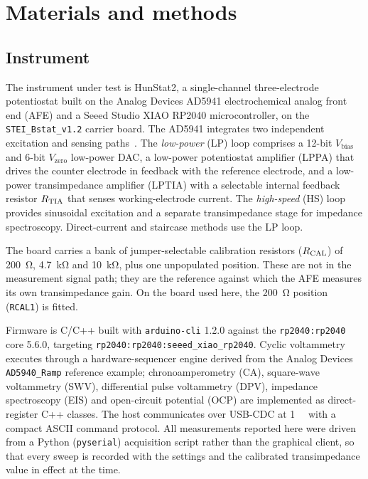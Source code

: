 \section{Materials and methods}
\label{sec:methods}

\subsection{Instrument}
\label{sec:instrument}

The instrument under test is HunStat2, a single-channel three-electrode
potentiostat built on the Analog Devices AD5941 electrochemical analog front end
(AFE) and a Seeed Studio XIAO RP2040 microcontroller, on the
\texttt{STEI\_Bstat\_v1.2} carrier board. The AD5941 integrates two independent
excitation and sensing paths~\cite{devices2024ad5940}. The \emph{low-power} (LP)
loop comprises a 12-bit $V_{\mathrm{bias}}$ and 6-bit $V_{\mathrm{zero}}$
low-power DAC, a low-power potentiostat amplifier (LPPA) that drives the counter
electrode in feedback with the reference electrode, and a low-power
transimpedance amplifier (LPTIA) with a selectable internal feedback resistor
$R_{\mathrm{TIA}}$ that senses working-electrode current. The \emph{high-speed} (HS) loop
provides sinusoidal excitation and a separate transimpedance stage for impedance
spectroscopy. Direct-current and staircase methods use the LP loop.

The board carries a bank of jumper-selectable calibration resistors
($R_{\mathrm{CAL}}$) of \SI{200}{\ohm}, \SI{4.7}{\kilo\ohm} and \SI{10}{\kilo\ohm}, plus one
unpopulated position. These are not in the measurement signal path; they are the
reference against which the AFE measures its own transimpedance gain. On the
board used here, the \SI{200}{\ohm} position (\texttt{RCAL1}) is fitted.

Firmware is C/C++ built with \texttt{arduino-cli} 1.2.0 against the
\texttt{rp2040:rp2040} core 5.6.0, targeting
\texttt{rp2040:rp2040:seeed\_xiao\_rp2040}. Cyclic voltammetry executes through a
hardware-sequencer engine derived from the Analog Devices \texttt{AD5940\_Ramp}
reference example; chronoamperometry (CA), square-wave voltammetry (SWV),
differential pulse voltammetry (DPV), impedance spectroscopy (EIS) and
open-circuit potential (OCP) are implemented as direct-register C++ classes. The
host communicates over USB-CDC at \SI{1}{\mega\baud} with a compact ASCII command
protocol. All measurements reported here were driven from a Python
(\texttt{pyserial}) acquisition script rather than the graphical client, so that
every sweep is recorded with the settings and the calibrated transimpedance
value in effect at the time.

